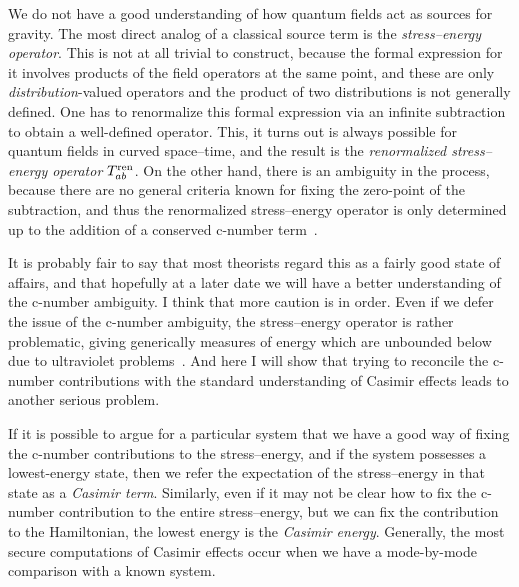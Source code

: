 \documentclass[12pt]{article}
\begin{document}
We do not have a good understanding of how quantum fields act as sources for gravity.
The most direct analog of a classical source term is the {\em stress--energy operator}.  This is not at all trivial to construct, because the formal expression for it involves products of the field operators at the same point, and these are only {\em distribution}-valued operators and the product of two distributions is not generally defined.  One has to renormalize this formal expression via an infinite subtraction to obtain a well-defined operator.  This, it turns out is always possible for quantum fields in curved space--time, and the result is the {\em renormalized stress--energy operator} $T^{\rm ren}_{ab}$.
On the other hand, there is an ambiguity in the process, because there are no general criteria known for fixing the zero-point of the subtraction, and thus the renormalized stress--energy operator is only determined up to the addition of a conserved c-number term~\citep{Wald:1995yp}.

It is probably fair to say that most theorists regard this as a fairly good state of affairs, and that hopefully at a later date we will have a better understanding of the c-number ambiguity.  I think that more caution is in order.  Even if we defer the issue of the c-number ambiguity, the stress--energy operator is rather problematic, giving generically measures of energy which are unbounded below due to ultraviolet problems~\citep{Helfer:1996my}.  And here I will show that trying to reconcile the c-number contributions with the standard understanding of Casimir effects leads to another serious problem.

If it is possible to argue for a particular system that we have a good way of fixing the 
c-number contributions to the stress--energy, and if the system possesses a lowest-energy state, then we refer the expectation of the stress--energy in that state as a {\em Casimir term}.  Similarly, even if it may not be clear how to fix the c-number contribution to the entire stress--energy, but we can fix the contribution to the Hamiltonian, the lowest energy is the {\em Casimir energy}.  Generally, the most secure computations of Casimir effects occur when we have a mode-by-mode comparison with a known system.
\end{document}
